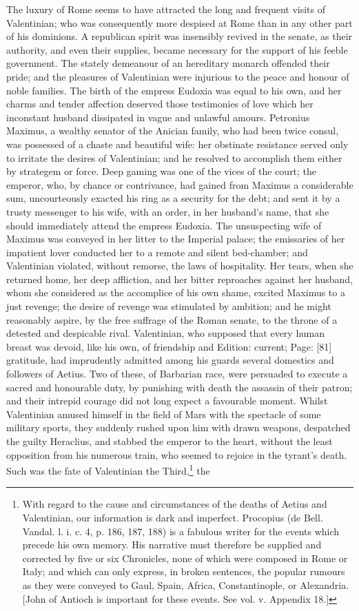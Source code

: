 The luxury of Rome seems to have attracted the long and frequent visits of Valentinian; who was consequently more despised at Rome than in any other part of his dominions. A republican spirit was insensibly revived in the senate, as their authority, and even their supplies, became necessary for the support of his feeble government. The stately demeanour of an hereditary monarch offended their pride; and the pleasures of Valentinian were injurious to the peace and honour of noble families. The birth of the empress Eudoxia was equal to his own, and her charms and tender affection deserved those testimonies of love which her inconstant husband dissipated in vague and unlawful amours. Petronius Maximus, a wealthy senator of the Anician family, who had been twice consul, was possessed of a chaste and beautiful wife: her obstinate resistance served only to irritate the desires of Valentinian; and he resolved to accomplish them either by strategem or force. Deep gaming was one of the vices of the court; the emperor, who, by chance or contrivance, had gained from Maximus a considerable sum, uncourteously exacted his ring as a security for the debt; and sent it by a trusty messenger to his wife, with an order, in her husband\texthebrew{}’s name, that she should immediately attend the empress Eudoxia. The unsuspecting wife of Maximus was conveyed in her litter to the Imperial palace; the emissaries of her impatient lover conducted her to a remote and silent bed-chamber; and Valentinian violated, without remorse, the laws of hospitality. Her tears, when she returned home, her deep affliction, and her bitter reproaches against her husband, whom she considered as the accomplice of his own shame, excited Maximus to a just revenge; the desire of revenge was stimulated by ambition; and he might reasonably aspire, by the free suffrage of the Roman senate, to the throne of a detested and despicable rival. Valentinian, who supposed that every human breast was devoid, like his own, of friendship and Edition: current; Page: [81] gratitude, had imprudently admitted among his guards several domestics and followers of Aetius. Two of these, of Barbarian race, were persuaded to execute a sacred and honourable duty, by punishing with death the assassin of their patron; and their intrepid courage did not long expect a favourable moment. Whilst Valentinian amused himself in the field of Mars with the spectacle of some military sports, they suddenly rushed upon him with drawn weapons, despatched the guilty Heraclius, and stabbed the emperor to the heart, without the least opposition from his numerous train, who seemed to rejoice in the tyrant\texthebrew{}’s death. Such was the fate of Valentinian the Third,\footnote{With regard to the cause and circumstances of the deaths of Aetius and Valentinian, our information is dark and imperfect. Procopius (de Bell. Vandal. l. i. c. 4, p. 186, 187, 188) is a fabulous writer for the events which precede his own memory. His narrative must therefore be supplied and corrected by five or six Chronicles, none of which were composed in Rome or Italy; and which can only express, in broken sentences, the popular rumours as they were conveyed to Gaul, Spain, Africa, Constantinople, or Alexandria. [John of Antioch is important for these events. See vol. v. Appendix 18.]} the 